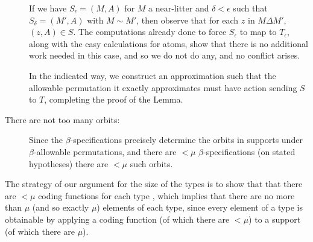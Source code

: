 \documentclass[112pt]{article}
\begin{document}
\begin{description}
If we have $S_\epsilon=(M,A)$ for $M$ a near-litter and $\delta<\epsilon$ such that
$S_\delta = (M',A)$ with $M \sim M'$, then observe that for each $z$ in $M \Delta M'$,
$(z,A) \in S$.  The computations already done to force $S_\epsilon$ to map to $T_\epsilon$, along with the easy calculations for atoms, show that there is no additional work needed in this case, and so we do not do any, and no conflict arises.

In the indicated way, we construct an approximation such that the allowable permutation it exactly approximates must have action sending $S$ to $T$, completing the proof of the Lemma.

\item[There are not too many orbits:]  Since the $\beta$-specifications precisely determine the orbits in supports under $\beta$-allowable permutations, and there are $<\mu$ $\beta$-specifications
(on stated hypotheses) there are $<\mu$ such orbits.
\end{description}





The strategy of our argument for the size of the types is to show that that there are $<\mu$ coding functions for each type , which implies that there are no more than $\mu$ (and so exactly $\mu$) elements of each type, since every element of a type is obtainable by applying a coding function (of which there are $<\mu$) to a support (of which there are $\mu$).
\end{document}
